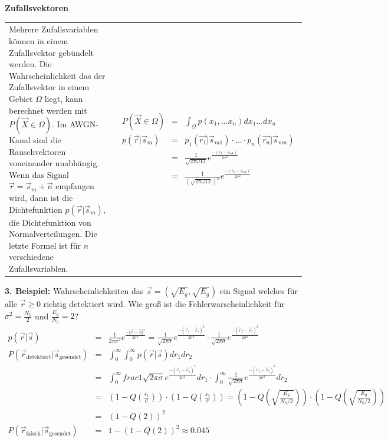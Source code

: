 \begin{center}
\textbf{Zufallsvektoren}
\end{center}
\begin{tabular}{ll}
 \addtolength{\jot}{2mm}
 \parbox{6cm}{Mehrere Zufallsvariablen können in einem Zufallsvektor gebündelt werden. Die Wahrscheinlichkeit das der Zufallsvektor in einem Gebiet $\Omega$ liegt, kann berechnet werden mit $P(\vec{X} \in \Omega)$. Im AWGN-Kanal sind die Rauschvektoren voneinander unabhängig. Wenn das Signal $\vec{r} = \vec{s}_m + \vec{n}$ empfangen wird, dann ist die Dichtefunktion $p(\vec{r} \vert \vec{s}_m)$, die Dichtefunktion von Normalverteilungen. Die letzte Formel ist für $n$ verschiedene Zufallsvariablen. 
}
 &
 \addtolength{\jot}{2mm}
 \parbox{6cm}{
 \begin{eqnarray*}
P(\vec{X} \in \Omega) &=& \int_{\Omega} p(x_1, ... x_n) dx_1 ... dx_n\\
p(\vec{r} \vert \vec{s}_m) &=& p_1(\vec{r_1} \vert \vec{s}_{m1}) \cdot ... \cdot p_n(\vec{r_n} \vert \vec{s}_{mn})\\
&=& \frac{1}{\sqrt{2 \pi \omega12}} e^{\frac{-(r_k - s_{mk})}{2 \sigma^2}}\\ 
&=& \frac{1}{(\sqrt{2 \pi \omega12})^n} e^{\frac{-(r_k - s_{mk})}{2 \sigma^2}} 
\end{eqnarray*}}
\end{tabular}
\vspace{10pt}
\textbf{3. Beispiel:} Wahrscheinlichkeiten das $\vec{s} = (\sqrt{E_g}, \sqrt{E_g})$ ein Signal welches für alle $\vec{r} \geq 0$ richtig detektiert wird. Wie groß ist die Fehlerwarscheinlichkeit für $\sigma^2 = \frac{N_0}{2}$ und $\frac{E_g}{N_0} = 2$?
\begin{eqnarray*}
p(\vec{r} \vert \vec{s}) &=& \frac{1}{2\pi \sigma^2} e^{\frac{- \Vert \vec{r} - \vec{s} \Vert^2}{2 \sigma^2}} = \frac{1}{\sqrt{2 \pi \sigma}} e^{\frac{- (\vec{r}_1 - \vec{s}_1)^2}{2 \sigma^2}} \cdot \frac{1}{\sqrt{2 \pi \sigma}} e^{\frac{- (\vec{r}_2 - \vec{s}_2)^2}{2 \sigma^2}} \\
P(\vec{r}_{\text{detektiert}} \vert \vec{s}_{\text{gesendet}}) &=& \int_0^{\infty} \int_0^{\infty}  p(\vec{r} \vert \vec{s}) dr_1 dr_2 \\
&=& \int_0^{\infty} frac{1}{\sqrt{2 \pi \sigma}} e^{\frac{- (\vec{r}_1 - \vec{s}_1)^2}{2 \sigma^2}} dr_1 \cdot \int_0^{\infty} \frac{1}{\sqrt{2 \pi \sigma}} e^{\frac{- (\vec{r}_2 - \vec{s}_2)^2}{2 \sigma^2}} dr_2 \\
&=& \left(1-Q\left(\frac{s_1}{\sigma} \right)  \right) \cdot \left(1-Q\left(\frac{s_2}{\sigma} \right)  \right)  = \left(1-Q \left(\sqrt{\frac{E_g}{N_0 /2}} \right)  \right) \cdot \left(1-Q \left(\sqrt{\frac{E_g}{N_0 /2}} \right)  \right)\\ &=& (1-Q(2))^2 \\
P(\vec{r}_{\text{falsch}} \vert \vec{s}_{\text{gesendet}}) &=& 1-(1-Q(2))^2 \approx 0.045
\end{eqnarray*}

